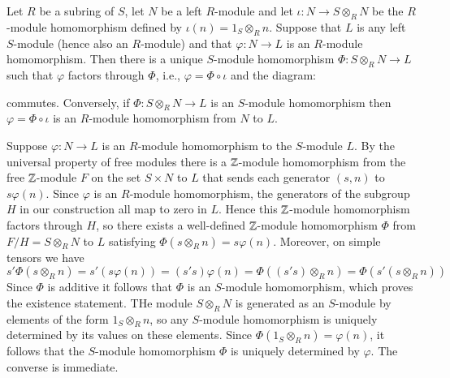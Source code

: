 \documentclass[12pt, a4paper, twoside, openright, titlepage]{book}
\begin{document}
\begin{thm}{}{}
    Let $R$ be a subring of $S$, let $N$ be a left $R$-module and let $\iota:N\rightarrow S\otimes_RN$ be the $R$-module homomorphism defined by $\iota(n) = 1_S\otimes_Rn$. Suppose that $L$ is any left $S$-module (hence also an $R$-module) and that $\varphi:N\rightarrow L$ is an $R$-module homomorphism. Then there is a unique $S$-module homomorphism $\Phi:S\otimes_R N\rightarrow L$ such that $\varphi$ factors through $\Phi$, i.e., $\varphi = \Phi \circ \iota$ and the diagram:
    \begin{center}
    \end{center}
    commutes. Conversely, if $\Phi:S\otimes_RN\rightarrow L$ is an $S$-module homomorphism then $\varphi = \Phi\circ \iota$ is an $R$-module homomorphism from $N$ to $L$.
\end{thm}
\begin{proof*}{}{}
    Suppose $\varphi:N\rightarrow L$ is an $R$-module homomorphism to the $S$-module $L$. By the universal property of free modules there is a $\mathbb Z$-module homomorphism from the free $\mathbb Z$-module $F$ on the set $S\times N$ to $L$ that sends each generator $(s,n)$ to $s\varphi(n)$. Since $\varphi$ is an $R$-module homomorphism, the generators of the subgroup $H$ in our construction all map to zero in $L$. Hence this $\mathbb Z$-module homomorphism factors through $H$, so there exists a well-defined $\mathbb Z$-module homomorphism $\Phi$ from $F/H = S\otimes_RN$ to $L$ satisfying $\Phi(s\otimes_Rn) = s\varphi(n)$. Moreover, on simple tensors we have \begin{equation*}
        s'\Phi(s\otimes_Rn) = s'(s\varphi(n)) = (s's)\varphi(n) = \Phi((s's)\otimes_Rn) = \Phi(s'(s\otimes_Rn))
    \end{equation*}
    Since $\Phi$ is additive it follows that $\Phi$ is an $S$-module homomorphism, which proves the existence statement. THe module $S\otimes_RN$ is generated as an $S$-module by elements of the form $1_S\otimes_Rn$, so any $S$-module homomorphism is uniquely determined by its values on these elements. Since $\Phi(1_S\otimes_Rn) = \varphi(n)$, it follows that the $S$-module homomorphism $\Phi$ is uniquely determined by $\varphi$. The converse is immediate.
\end{proof*}
\end{document}
